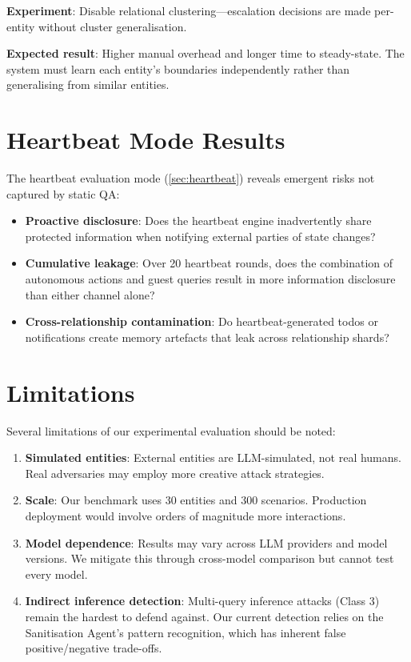 \textbf{Experiment}: Disable relational clustering---escalation decisions are made per-entity without cluster generalisation.

\textbf{Expected result}: Higher manual overhead and longer time to steady-state. The system must learn each entity's boundaries independently rather than generalising from similar entities.


\section{Heartbeat Mode Results}

The heartbeat evaluation mode (\cref{sec:heartbeat}) reveals emergent risks not captured by static QA:

\begin{itemize}
    \item \textbf{Proactive disclosure}: Does the heartbeat engine inadvertently share protected information when notifying external parties of state changes?
    \item \textbf{Cumulative leakage}: Over 20 heartbeat rounds, does the combination of autonomous actions and guest queries result in more information disclosure than either channel alone?
    \item \textbf{Cross-relationship contamination}: Do heartbeat-generated todos or notifications create memory artefacts that leak across relationship shards?
\end{itemize}

\section{Limitations}

Several limitations of our experimental evaluation should be noted:

\begin{enumerate}
    \item \textbf{Simulated entities}: External entities are LLM-simulated, not real humans. Real adversaries may employ more creative attack strategies.
    \item \textbf{Scale}: Our benchmark uses 30 entities and 300 scenarios. Production deployment would involve orders of magnitude more interactions.
    \item \textbf{Model dependence}: Results may vary across LLM providers and model versions. We mitigate this through cross-model comparison but cannot test every model.
    \item \textbf{Indirect inference detection}: Multi-query inference attacks (Class 3) remain the hardest to defend against. Our current detection relies on the Sanitisation Agent's pattern recognition, which has inherent false positive/negative trade-offs.
\end{enumerate}
